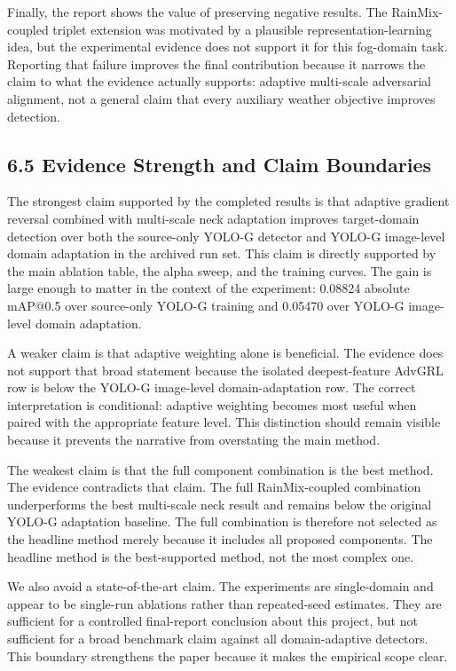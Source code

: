 \documentclass[
  11pt,
]{article}
\begin{document}
Finally, the report shows the value of preserving negative results. The
RainMix-coupled triplet extension was motivated by a plausible
representation-learning idea, but the experimental evidence does not
support it for this fog-domain task. Reporting that failure improves the
final contribution because it narrows the claim to what the evidence
actually supports: adaptive multi-scale adversarial alignment, not a
general claim that every auxiliary weather objective improves detection.

\hypertarget{evidence-strength-and-claim-boundaries}{%
\subsection{6.5 Evidence Strength and Claim
Boundaries}\label{evidence-strength-and-claim-boundaries}}

The strongest claim supported by the completed results is that adaptive
gradient reversal combined with multi-scale neck adaptation improves
target-domain detection over both the source-only YOLO-G detector and
YOLO-G image-level domain adaptation in the archived run set. This claim
is directly supported by the main ablation table, the alpha sweep, and
the training curves. The gain is large enough to matter in the context
of the experiment: 0.08824 absolute mAP@0.5 over source-only YOLO-G
training and 0.05470 over YOLO-G image-level domain adaptation.

A weaker claim is that adaptive weighting alone is beneficial. The
evidence does not support that broad statement because the isolated
deepest-feature AdvGRL row is below the YOLO-G image-level
domain-adaptation row. The correct interpretation is conditional:
adaptive weighting becomes most useful when paired with the appropriate
feature level. This distinction should remain visible because it
prevents the narrative from overstating the main method.

The weakest claim is that the full component combination is the best
method. The evidence contradicts that claim. The full RainMix-coupled
combination underperforms the best multi-scale neck result and remains
below the original YOLO-G adaptation baseline. The full combination is
therefore not selected as the headline method merely because it includes
all proposed components. The headline method is the best-supported
method, not the most complex one.

We also avoid a state-of-the-art claim. The experiments are
single-domain and appear to be single-run ablations rather than
repeated-seed estimates. They are sufficient for a controlled
final-report conclusion about this project, but not sufficient for a
broad benchmark claim against all domain-adaptive detectors. This
boundary strengthens the paper because it makes the empirical scope
clear.
\end{document}
